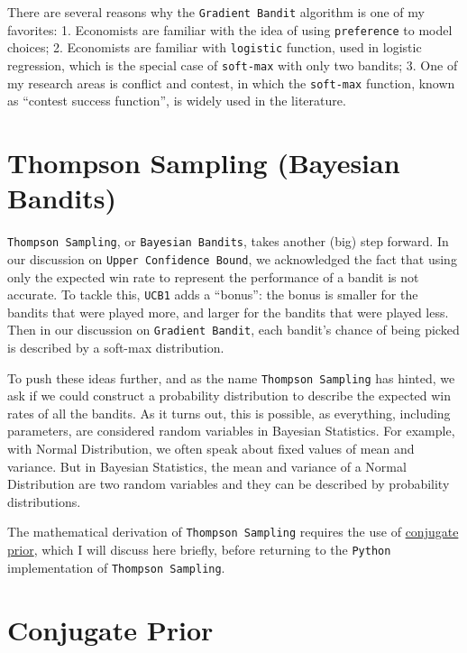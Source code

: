 \documentclass[
]{book}
\theoremstyle{definition}
\theoremstyle{definition}
\theoremstyle{definition}
\theoremstyle{definition}
\theoremstyle{remark}
\begin{document}
There are several reasons why the \texttt{Gradient\ Bandit} algorithm is one of my favorites:
1. Economists are familiar with the idea of using \texttt{preference} to model choices;
2. Economists are familiar with \texttt{logistic} function, used in logistic regression, which is the special case of \texttt{soft-max} with only two bandits;
3. One of my research areas is conflict and contest, in which the \texttt{soft-max} function, known as ``contest success function'', is widely used in the literature.

\hypertarget{thompson-sampling-bayesian-bandits}{%
\section{Thompson Sampling (Bayesian Bandits)}\label{thompson-sampling-bayesian-bandits}}

\texttt{Thompson\ Sampling}, or \texttt{Bayesian\ Bandits}, takes another (big) step forward. In our discussion on \texttt{Upper\ Confidence\ Bound}, we acknowledged the fact that using only the expected win rate to represent the performance of a bandit is not accurate. To tackle this, \texttt{UCB1} adds a ``bonus'': the bonus is smaller for the bandits that were played more, and larger for the bandits that were played less. Then in our discussion on \texttt{Gradient\ Bandit}, each bandit's chance of being picked is described by a soft-max distribution.

To push these ideas further, and as the name \texttt{Thompson\ Sampling} has hinted, we ask if we could construct a probability distribution to describe the expected win rates of all the bandits. As it turns out, this is possible, as everything, including parameters, are considered random variables in Bayesian Statistics. For example, with Normal Distribution, we often speak about fixed values of mean and variance. But in Bayesian Statistics, the mean and variance of a Normal Distribution are two random variables and they can be described by probability distributions.

The mathematical derivation of \texttt{Thompson\ Sampling} requires the use of \href{https://en.wikipedia.org/wiki/Conjugate_prior}{conjugate prior}, which I will discuss here briefly, before returning to the \texttt{Python} implementation of \texttt{Thompson\ Sampling}.

\hypertarget{conjugate-prior}{%
\section{Conjugate Prior}\label{conjugate-prior}}
\end{document}

